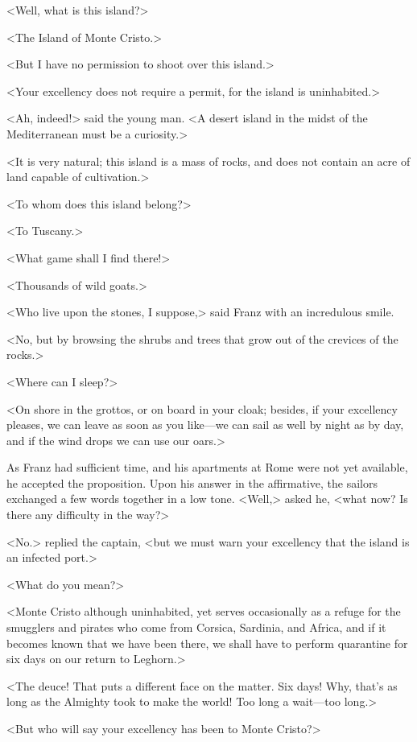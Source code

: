  <Well, what is this island?> 

 <The Island of Monte Cristo.> 

 <But I have no permission to shoot over this island.> 

 <Your excellency does not require a permit, for the island is uninhabited.> 

 <Ah, indeed!> said the young man. <A desert island in the midst of the Mediterranean must be a curiosity.> 

 <It is very natural; this island is a mass of rocks, and does not contain an acre of land capable of cultivation.> 

 <To whom does this island belong?> 

 <To Tuscany.> 

 <What game shall I find there!> 

 <Thousands of wild goats.> 

 <Who live upon the stones, I suppose,> said Franz with an incredulous smile. 

 <No, but by browsing the shrubs and trees that grow out of the crevices of the rocks.> 

 <Where can I sleep?> 

 <On shore in the grottos, or on board in your cloak; besides, if your excellency pleases, we can leave as soon as you like—we can sail as well by night as by day, and if the wind drops we can use our oars.> 

 As Franz had sufficient time, and his apartments at Rome were not yet available, he accepted the proposition. Upon his answer in the affirmative, the sailors exchanged a few words together in a low tone. <Well,> asked he, <what now? Is there any difficulty in the way?> 

 <No.> replied the captain, <but we must warn your excellency that the island is an infected port.> 

 <What do you mean?> 

 <Monte Cristo although uninhabited, yet serves occasionally as a refuge for the smugglers and pirates who come from Corsica, Sardinia, and Africa, and if it becomes known that we have been there, we shall have to perform quarantine for six days on our return to Leghorn.> 

 <The deuce! That puts a different face on the matter. Six days! Why, that's as long as the Almighty took to make the world! Too long a wait—too long.> 

 <But who will say your excellency has been to Monte Cristo?> 

